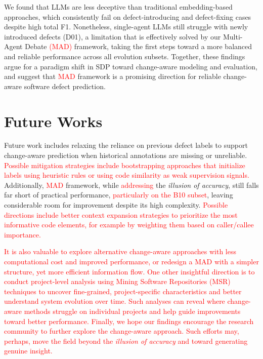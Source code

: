 \documentclass[authoryear,final,5p,times,twocolumn]{elsarticle}
\theoremstyle{plain}
\begin{document}
We found that LLMs are less deceptive than traditional embedding-based approaches, which consistently fail on defect-introducing and defect-fixing cases despite high total F1. Nonetheless, single-agent LLMs still struggle with newly introduced defects (D01), a limitation that is effectively solved by our Multi-Agent Debate \textcolor{red}{(MAD)} framework, taking the first steps toward a more balanced and reliable performance across all evolution subsets. Together, these findings argue for a paradigm shift in SDP toward change-aware modeling and evaluation, and suggest that \textcolor{red}{MAD} framework is a promising direction for reliable change-aware software defect prediction.

\section{Future Works}
\label{sec:future_works}
Future work includes relaxing the reliance on previous defect labels to support change-aware prediction when historical annotations are missing or unreliable. \textcolor{red}{Possible mitigation strategies include bootstrapping approaches that initialize labels using heuristic rules or using code similarity as weak supervision signals.}
Additionally, \textcolor{red}{MAD} framework, while \textcolor{red}{addressing} the \emph{illusion of accuracy}, still falls far short of practical performance, \textcolor{red}{particularly on the B10 subset}, leaving considerable room for improvement despite its high complexity.
\textcolor{red}{Possible directions include better context expansion strategies to prioritize the most informative code elements, for example by weighting them based on caller/callee importance.}

\textcolor{red}{
It is also valuable to explore alternative change-aware approaches with less computational cost and improved performance, or redesign a MAD with a simpler structure, yet more efficient information flow.
One other insightful direction is to conduct project-level analysis using Mining Software Repositories (MSR) techniques to uncover fine-grained, project-specific characteristics and better understand system evolution over time. Such analyses can reveal where change-aware methods struggle on individual projects and help guide improvements toward better performance.
Finally, we hope our findings encourage the research community to further explore the change-aware approach. Such efforts may, perhaps, move the field beyond the \emph{illusion of accuracy} and toward generating genuine insight.}
\end{document}
